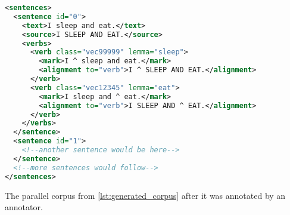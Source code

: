 \begin{listing}
\begin{lstlisting}[language=xml]
<sentences>
  <sentence id="0">
    <text>I sleep and eat.</text>
    <source>I SLEEP AND EAT.</source>
    <verbs>
      <verb class="vec99999" lemma="sleep">
        <mark>I ^ sleep and eat.</mark>
        <alignment to="verb">I ^ SLEEP AND EAT.</alignment>
      </verb>
      <verb class="vec12345" lemma="eat">
        <mark>I sleep and ^ eat.</mark>
        <alignment to="verb">I SLEEP AND ^ EAT.</alignment>
      </verb>
    </verbs>
  </sentence>
  <sentence id="1">
    <!--another sentence would be here-->
  </sentence>
  <!--more sentences would follow-->
</sentences>
\end{lstlisting}
\caption{The parallel corpus from \cref{lst:generated_corpus} after it was annotated by an annotator.}
\label{lst:annotated_corpus}
\end{listing}
